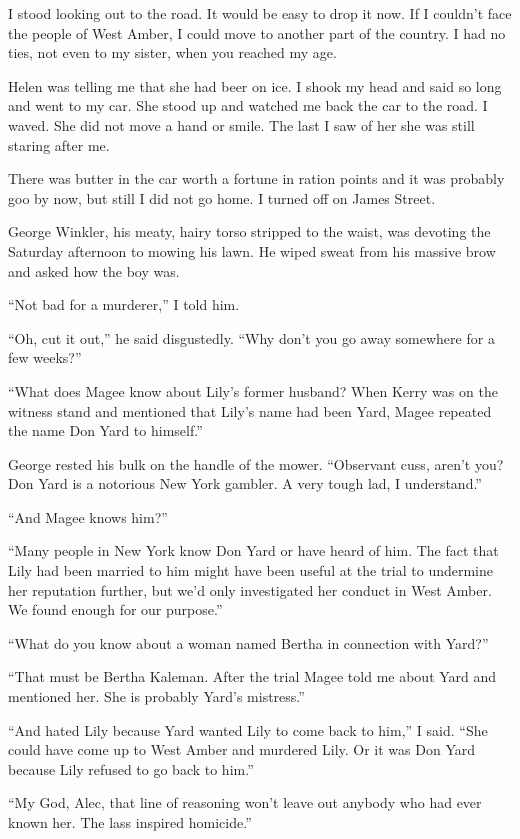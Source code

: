 \documentclass{novel}
\begin{document}
I stood looking out to the road. It would be easy to drop it now. If I couldn’t face the people of West Amber, I could move to another part of the country. I had no ties, not even to my sister, when you reached my age.

Helen was telling me that she had beer on ice. I shook my head and said so long and went to my car. She stood up and watched me back the car to the road. I waved. She did not move a hand or smile. The last I saw of her she was still staring after me.

\scenestars

There was butter in the car worth a fortune in ration points and it was probably goo by now, but still I did not go home. I turned off on James Street.

George Winkler, his meaty, hairy torso stripped to the waist, was devoting the Saturday afternoon to mowing his lawn. He wiped sweat from his massive brow and asked how the boy was.

“Not bad for a murderer,” I told him.

“Oh, cut it out,” he said disgustedly. “Why don’t you go away somewhere for a few weeks?”

“What does Magee know about Lily’s former husband? When Kerry was on the witness stand and mentioned that Lily’s name had been Yard, Magee repeated the name Don Yard to himself.”

George rested his bulk on the handle of the mower. “Observant cuss, aren’t you? Don Yard is a notorious New York gambler. A very tough lad, I understand.”

“And Magee knows him?”

“Many people in New York know Don Yard or have heard of him. The fact that Lily had been married to him might have been useful at the trial to undermine her reputation further, but we’d only investigated her conduct in West Amber. We found enough for our purpose.”

“What do you know about a woman named Bertha in connection with Yard?”

“That must be Bertha Kaleman. After the trial Magee told me about Yard and mentioned her. She is probably Yard’s mistress.”

“And hated Lily because Yard wanted Lily to come back to him,” I said. “She could have come up to West Amber and murdered Lily. Or it was Don Yard because Lily refused to go back to him.”

“My God, Alec, that line of reasoning won’t leave out anybody who had ever known her. The lass inspired homicide.”
\end{document}
